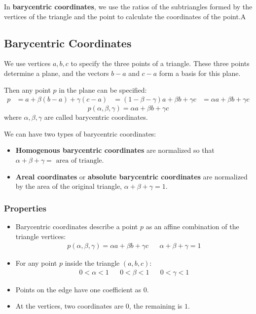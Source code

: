 \documentclass[11pt]{article}
\begin{document}
In \textbf{barycentric coordinates}, we use the ratios of the subtriangles formed by the vertices of the triangle and the point to calculate the coordinates of the point.A

\subsection{Barycentric Coordinates}
We use vertices $a, b, c$ to specify the three points of a triangle.
These three points determine a plane, and the vectors $b - a$ and $c - a$ form a basis for this plane.

Then any point $p$ in the plane can be specified:
\begin{align*}
  p &= a + \beta (b - a) + \gamma(c - a) 
  &= (1 - \beta - \gamma) a + \beta b + \gamma c
  &= \alpha a + \beta b + \gamma c
\end{align*}
\[
  p(\alpha, \beta, \gamma) = \alpha a + \beta b + \gamma c
\]
where $\alpha, \beta, \gamma$ are called barycentric coordinates.

We can have two types of barycentric coordinates:
\begin{itemize}
  \item \textbf{Homogenous barycentric coordinates} are normalized so that $\alpha + \beta + \gamma = \text{ area of triangle}$.
  \item \textbf{Areal coordinates} or \textbf{absolute barycentric coordinates} are normalized by the area of the original triangle, $\alpha + \beta + \gamma = 1$.
\end{itemize}

\subsubsection{Properties}
\begin{itemize}
  \item Barycentric coordinates describe a point $p$ as an affine combination of the triangle vertices:
    \begin{align*}
      p(\alpha, \beta, \gamma) = \alpha a + \beta b + \gamma c & & \alpha + \beta + \gamma = 1
    \end{align*}
  \item For any point $p$ inside the triangle $(a, b, c)$:
    \begin{align*}
      0 < \alpha < 1 && 0 < \beta < 1 && 0 < \gamma < 1
    \end{align*}
  \item Points on the edge have one coefficient as $0$.
  \item At the vertices, two coordinates are $0$, the remaining is $1$.
\end{itemize}
\end{document}
